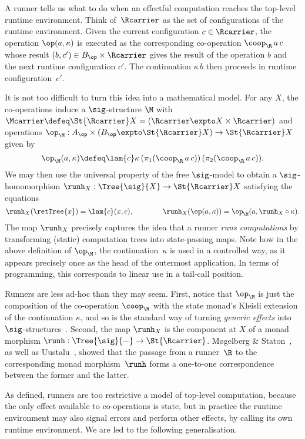 A runner tells us what to do when an effectful computation reaches the top-level runtime
environment. Think of~$\Rcarrier$ as the set of configurations of the runtime environment. Given
the current configuration $c \in \Rcarrier$, the operation $\op(a, \kappa)$ is executed as the
corresponding co-operation $\coop_\R\,a\,c$ whose result $(b, c') \in B_\op \times \Rcarrier$ gives
the result of the operation $b$ and 
the next runtime configuration $c'$. The continuation $\kappa\,b$
then proceeds in runtime configuration~$c'$.

It is not too difficult to turn this idea into a mathematical model. For any
$X$, the co-operations induce a $\sig$-structure $\M$ with
$\Mcarrier \defeq \St{\Rcarrier} X = (\Rcarrier \expto X \times \Rcarrier)$ 
and operations $\op_\M : A_\op \times (B_\op \expto \St{\Rcarrier} X) \to \St{\Rcarrier} X$
given by
%
\begin{equation*}
  \op_\M (a, \kappa) \defeq \lam{c} \kappa\, (\pi_1 (\coop_\R\,a\,c))\, (\pi_2 (\coop_\R\,a\,c)).
\end{equation*}
%
We may then use the universal property of the free $\sig$-model to obtain a $\sig$-homomorphism
$\runh_X : \Tree{\sig}{X} \to \St{\Rcarrier} X$ satisfying the equations
%
\[
  \runh_X(\retTree{x}) = \lam{c} (x, c),
  \qquad\qquad
  \runh_X(\op(a, \kappa)) = \op_\M(a, \runh_X \circ \kappa).
\]
%
The map $\runh_X$ precisely captures the idea that a runner
\emph{runs computations} by transforming (static) computation trees into
state-passing maps. Note how in the above definition of $\op_\M$, the
continuation~$\kappa$ is used in a controlled way, as it appears precisely once
as the head of the outermost application. In terms of programming, this
corresponds to linear use in a tail-call position.

Runners are less ad-hoc than they may seem. First, notice that $\op_\M$ is just the
composition of the co-operation $\coop_\R$ with
the state monad's Kleisli extension of the continuation $\kappa$, and so is
the standard way of turning \emph{generic effects} into $\sig$-structures~\cite{Plotkin:AlgOperations}.
%
Second, the map $\runh_X$ is the component at $X$ of a monad morphism
$\runh : \Tree{\sig}{{-}} \to \St{\Rcarrier}$. Møgelberg \& Staton~\cite{Mogelberg:LinearUsageOfState}, as
well as Uustalu~\cite{Uustalu:Runners}, showed that the passage from a runner~$\R$ to the
corresponding monad morphism~$\runh$ forms a one-to-one correspondence between the former and the
latter.

As defined, runners are too restrictive a model of top-level computation, because the only
effect available to co-operations is state, but in practice the runtime
environment may also signal errors and perform other effects, by calling its own runtime
environment. We are led to the following generalisation.

